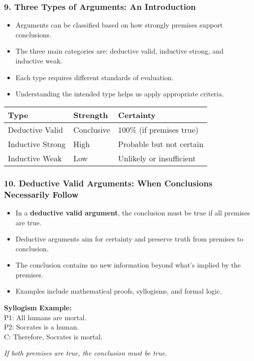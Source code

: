 \documentclass{beamer}
\begin{document}
\begin{frame}
\frametitle{9. Three Types of Arguments: An Introduction}
\begin{itemize}
\item Arguments can be classified based on how strongly premises support conclusions.
\item The three main categories are: deductive valid, inductive strong, and inductive weak.
\item Each type requires different standards of evaluation.
\item Understanding the intended type helps us apply appropriate criteria.
\end{itemize}

\begin{table}
\begin{tabular}{|l|l|l|}
\hline
\textbf{Type} & \textbf{Strength} & \textbf{Certainty} \\
\hline
Deductive Valid & Conclusive & 100\% (if premises true) \\
Inductive Strong & High & Probable but not certain \\
Inductive Weak & Low & Unlikely or insufficient \\
\hline
\end{tabular}
\end{table}
\end{frame}

\begin{frame}
\frametitle{10. Deductive Valid Arguments: When Conclusions Necessarily Follow}
\begin{itemize}
\item In a \textbf{deductive valid argument}, the conclusion must be true if all premises are true.
\item Deductive arguments aim for certainty and preserve truth from premises to conclusion.
\item The conclusion contains no new information beyond what's implied by the premises.
\item Examples include mathematical proofs, syllogisms, and formal logic.
\end{itemize}

\begin{example}
\small
\textbf{Syllogism Example:}\\
P1: All humans are mortal.\\
P2: Socrates is a human.\\
C: Therefore, Socrates is mortal.

\textit{If both premises are true, the conclusion must be true.}
\end{example}
\end{frame}
\end{document}
